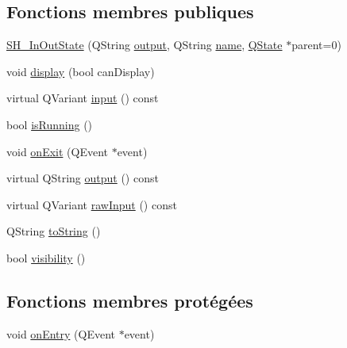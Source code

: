 \subsection*{Fonctions membres publiques}
\begin{DoxyCompactItemize}
\item 
\hyperlink{classSimpleHotel_1_1SH__InOutState_a0b4a01036ca8fd4777dbc6dfdd8f3672}{S\-H\-\_\-\-In\-Out\-State} (Q\-String \hyperlink{classSimpleHotel_1_1SH__InOutState_a71b15e4d49b9c2aa540500065ceb39da}{output}, Q\-String \hyperlink{classSimpleHotel_1_1SH__NamedObject_ad144716345034c91cface8f3163a799e}{name}, \hyperlink{classQState}{Q\-State} $\ast$parent=0)
\item 
void \hyperlink{classSimpleHotel_1_1SH__InOutState_a1cbe5befe4f42e0941165498ed0117a9}{display} (bool can\-Display)
\item 
virtual Q\-Variant \hyperlink{classSimpleHotel_1_1SH__InOutState_a487d2ca6200fed372b1a27cfa27774db}{input} () const 
\item 
bool \hyperlink{classSimpleHotel_1_1SH__GenericState_a5151ff071129bdd4dcf7c60cb93794da}{is\-Running} ()
\item 
void \hyperlink{classSimpleHotel_1_1SH__InOutState_aa5fc1b9281087bd8abcd6873d2a36009}{on\-Exit} (Q\-Event $\ast$event)
\item 
virtual Q\-String \hyperlink{classSimpleHotel_1_1SH__InOutState_a71b15e4d49b9c2aa540500065ceb39da}{output} () const 
\item 
virtual Q\-Variant \hyperlink{classSimpleHotel_1_1SH__InOutState_a5e8064672e20c7b13fec67a4955a3ce3}{raw\-Input} () const 
\item 
Q\-String \hyperlink{classSimpleHotel_1_1SH__GenericState_adaded78178f9999a9e07a32871af5e61}{to\-String} ()
\item 
bool \hyperlink{classSimpleHotel_1_1SH__InOutState_a145a6e0e2c9e22971e35aa4538adeb4a}{visibility} ()
\end{DoxyCompactItemize}
\subsection*{Fonctions membres protégées}
\begin{DoxyCompactItemize}
\item 
void \hyperlink{classSimpleHotel_1_1SH__GenericState_adebdb330ff20556a54a833b15e50eacc}{on\-Entry} (Q\-Event $\ast$event)
\end{DoxyCompactItemize}
